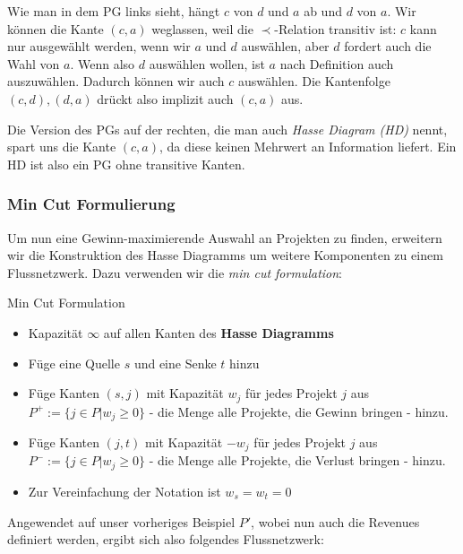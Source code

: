 \documentclass{panikzettel}
\begin{document}
Wie man in dem PG links sieht, hängt $c$ von $d$ und $a$ ab und $d$ von $a$. Wir können die Kante $(c,a)$ weglassen, weil die $\prec$-Relation transitiv ist: $c$ kann nur ausgewählt werden, wenn wir $a$ und $d$ auswählen, aber $d$ fordert auch die Wahl von $a$. Wenn also $d$ auswählen wollen, ist $a$ nach Definition auch auszuwählen. Dadurch können wir auch $c$ auswählen. Die Kantenfolge $(c,d), (d,a)$ drückt also implizit auch $(c,a)$ aus.

Die Version des PGs auf der rechten, die man auch \emph{Hasse Diagram (HD)} nennt, spart uns die Kante $(c,a)$, da diese keinen Mehrwert an Information liefert. Ein HD ist also ein PG ohne transitive Kanten.

\subsubsection{Min Cut Formulierung}

Um nun eine Gewinn-maximierende Auswahl an Projekten zu finden, erweitern wir die Konstruktion des Hasse Diagramms um weitere Komponenten zu einem Flussnetzwerk. Dazu verwenden wir die \emph{min cut formulation}:

\begin{defi}{Min Cut Formulation}
	\begin{itemize}
		\item Kapazität $\infty$ auf allen Kanten des \textbf{Hasse Diagramms}
		\item Füge eine Quelle $s$ und eine Senke $t$ hinzu
		\item Füge Kanten $(s,j)$ mit Kapazität $w_j$ für jedes Projekt $j$ aus $P^+ := \{j \in P | w_j \geq 0 \}$ - die Menge alle Projekte, die Gewinn bringen - hinzu.
		\item Füge Kanten $(j,t)$ mit Kapazität $- w_j$ für jedes Projekt $j$ aus $P^- := \{j \in P | w_j \geq 0 \}$ - die Menge alle Projekte, die Verlust bringen - hinzu.
		\item Zur Vereinfachung der Notation ist $w_s = w_t = 0$
	\end{itemize}
\end{defi} 

Angewendet auf unser vorheriges Beispiel $P'$, wobei nun auch die Revenues definiert werden, ergibt sich also folgendes Flussnetzwerk:
\end{document}
